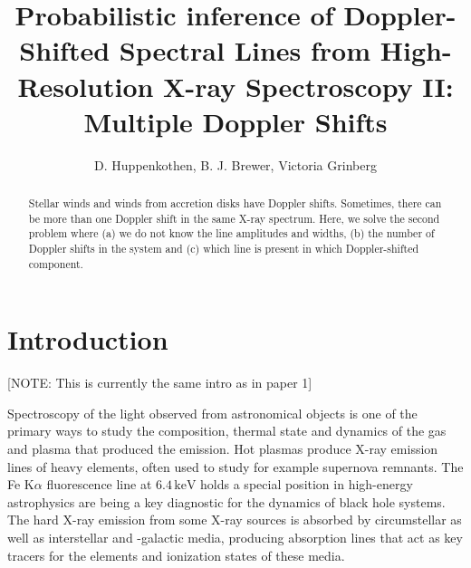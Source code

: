 \documentclass[12pt]{emulateapj}
\begin{document}
\title{Probabilistic inference of Doppler-Shifted Spectral Lines from High-Resolution X-ray Spectroscopy II: Multiple Doppler Shifts}

\author{D. Huppenkothen, B. J. Brewer, Victoria Grinberg}
 


\begin{abstract}
Stellar winds and winds from accretion disks have Doppler shifts. Sometimes, there can be more than one Doppler shift in 
the same X-ray spectrum. Here, we solve the second problem where (a) we do not know the line amplitudes and widths, (b) the 
number of Doppler shifts in the system and (c) which line is present in which Doppler-shifted component.
\end{abstract}


\section{Introduction}
[NOTE: This is currently the same intro as in paper 1]

Spectroscopy of the light observed from astronomical objects is one of the primary ways to study the composition, thermal state and dynamics of the gas and plasma that produced the emission. Hot plasmas produce X-ray emission lines of heavy elements, often used to study for example supernova remnants. The Fe K$\alpha$ fluorescence line at $6.4 \, \mathrm{keV}$ holds a special position in high-energy astrophysics are being a key diagnostic for the dynamics of black hole systems. The hard X-ray emission from some X-ray sources is absorbed by circumstellar as well as interstellar and -galactic media, producing absorption lines that act as key tracers for the elements and ionization states of these media. 
\end{document}
